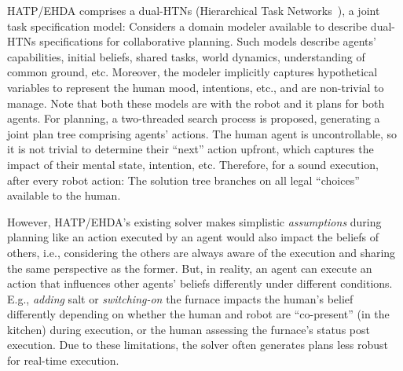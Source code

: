 \documentclass[letterpaper]{article} %
\begin{document}
HATP/EHDA comprises a dual-HTNs (Hierarchical Task Networks~\cite{naubooks0014222}), a joint task specification model: 
Considers a domain modeler available to describe dual-HTNs specifications for collaborative planning. 
Such models describe agents'  capabilities, initial beliefs, shared tasks, world dynamics, understanding of common ground, etc. Moreover, the modeler implicitly captures hypothetical variables to represent the human mood, intentions, etc., and are non-trivial to manage. Note that both these models are with the robot and it plans for both agents. 
For planning, a two-threaded search process is proposed, generating a joint plan tree comprising agents' actions. 
The human agent is uncontrollable, so it is not trivial to determine their ``next'' action upfront, which captures the impact of their mental state, intention,  etc.
Therefore, for a sound execution, after every robot action: The solution tree branches on all legal ``choices'' available to the human.
 
However, 
HATP/EHDA's existing solver makes simplistic \textit{assumptions} during planning like an action executed by an agent would also impact the beliefs of others, i.e., considering the others are always aware of the execution and sharing the same perspective as the former. But, in reality, an agent can execute an action that influences other agents' beliefs differently under different conditions. E.g., \textit{adding} salt or \textit{switching-on} the furnace impacts the human's belief differently depending on whether the human and robot are ``co-present'' (in the kitchen) during execution, or the human assessing the furnace's status post execution.  
Due to these limitations, the solver often generates plans less robust for real-time execution.        
\end{document}
